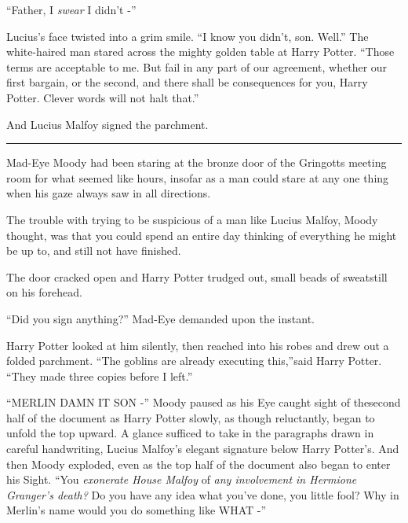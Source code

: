 ``Father, I \emph{swear} I didn't -''

Lucius's face twisted into a grim smile. ``I know you didn't, son. Well.'' The white-haired man stared across the mighty golden table at Harry Potter. ``Those terms are acceptable to me. But fail in any part of our agreement, whether our first bargain, or the second, and there shall be consequences for you, Harry Potter. Clever words will not halt that.''

And Lucius Malfoy signed the parchment.

\begin{center}\rule{3in}{0.4pt}\end{center}

Mad-Eye Moody had been staring at the bronze door of the Gringotts meeting room for what seemed like hours, insofar as a man could stare at any one thing when his gaze always saw in all directions.

The trouble with trying to be suspicious of a man like Lucius Malfoy, Moody thought, was that you could spend an entire day thinking of everything he might be up to, and still not have finished.

The door cracked open and Harry Potter trudged out, small beads of sweatstill on his forehead.

``Did you sign anything?'' Mad-Eye demanded upon the instant.

Harry Potter looked at him silently, then reached into his robes and drew out a folded parchment. ``The goblins are already executing this,''said Harry Potter. ``They made three copies before I left.''

``MERLIN DAMN IT SON -'' Moody paused as his Eye caught sight of thesecond half of the document as Harry Potter slowly, as though reluctantly, began to unfold the top upward. A glance sufficed to take in the paragraphs drawn in careful handwriting, Lucius Malfoy's elegant signature below Harry Potter's. And then Moody exploded, even as the top half of the document also began to enter his Sight. ``You \emph{exonerate House Malfoy} of \emph{any involvement in Hermione Granger's death?} Do you have any idea what you've done, you little fool? Why in Merlin's name would you do something like WHAT -''